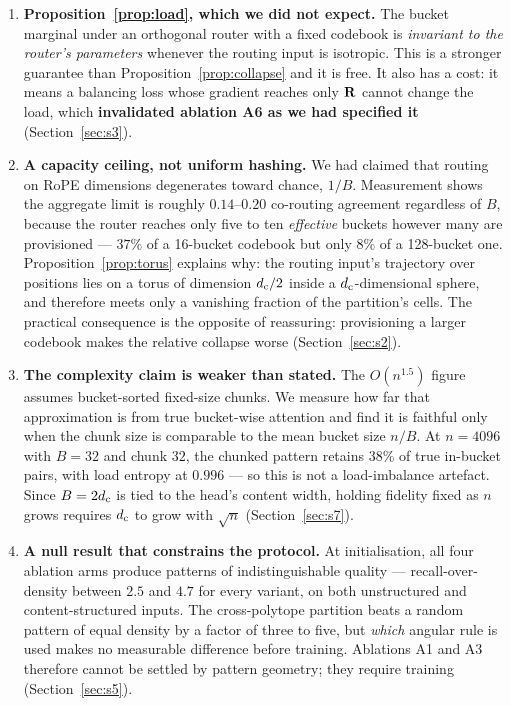 \begin{enumerate}
\item \textbf{Proposition~\ref{prop:load}, which we did not expect.} The bucket marginal under an orthogonal router with a fixed codebook is \emph{invariant to the router's parameters} whenever the routing input is isotropic. This is a stronger guarantee than Proposition~\ref{prop:collapse} and it is free. It also has a cost: it means a balancing loss whose gradient reaches only $\mathbf{R}$ cannot change the load, which \textbf{invalidated ablation A6 as we had specified it} (Section~\ref{sec:s3}).

\item \textbf{A capacity ceiling, not uniform hashing.} We had claimed that routing on RoPE dimensions degenerates toward chance, $1/B$. Measurement shows the aggregate limit is roughly $0.14$--$0.20$ co-routing agreement regardless of $B$, because the router reaches only five to ten \emph{effective} buckets however many are provisioned --- $37\%$ of a 16-bucket codebook but only $8\%$ of a 128-bucket one. Proposition~\ref{prop:torus} explains why: the routing input's trajectory over positions lies on a torus of dimension $d_{\mathrm{c}}/2$ inside a $d_{\mathrm{c}}$-dimensional sphere, and therefore meets only a vanishing fraction of the partition's cells. The practical consequence is the opposite of reassuring: provisioning a larger codebook makes the relative collapse worse (Section~\ref{sec:s2}).

\item \textbf{The complexity claim is weaker than stated.} The $O(n^{1.5})$ figure assumes bucket-sorted fixed-size chunks. We measure how far that approximation is from true bucket-wise attention and find it is faithful only when the chunk size is comparable to the mean bucket size $n/B$. At $n = 4096$ with $B = 32$ and chunk $32$, the chunked pattern retains $38\%$ of true in-bucket pairs, with load entropy at $0.996$ --- so this is not a load-imbalance artefact. Since $B = 2d_{\mathrm{c}}$ is tied to the head's content width, holding fidelity fixed as $n$ grows requires $d_{\mathrm{c}}$ to grow with $\sqrt{n}$ (Section~\ref{sec:s7}).

\item \textbf{A null result that constrains the protocol.} At initialisation, all four ablation arms produce patterns of indistinguishable quality --- recall-over-density between $2.5$ and $4.7$ for every variant, on both unstructured and content-structured inputs. The cross-polytope partition beats a random pattern of equal density by a factor of three to five, but \emph{which} angular rule is used makes no measurable difference before training. Ablations A1 and A3 therefore cannot be settled by pattern geometry; they require training (Section~\ref{sec:s5}).
\end{enumerate}

